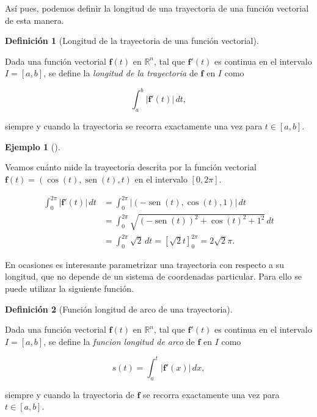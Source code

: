 \documentclass[
  a4paper,
]{scrreport}
\theoremstyle{definition}
\newtheorem{example}{Ejemplo}[chapter]
\theoremstyle{plain}
\theoremstyle{definition}
\newtheorem{definition}{Definición}[chapter]
\theoremstyle{definition}
\theoremstyle{plain}
\theoremstyle{plain}
\theoremstyle{remark}
\begin{document}
Así pues, podemos definir la longitud de una trayectoria de una función
vectorial de esta manera.

\begin{definition}[Longitud de la trayectoria de una función
vectorial]\protect\hypertarget{def-longitud-trayectoria-funcion-vectorial}{}\label{def-longitud-trayectoria-funcion-vectorial}

Dada una función vectorial \(\mathbf{f}(t)\) en \(\mathbb{R}^n\), tal
que \(\mathbf{f}'(t)\) es continua en el intervalo \(I=[a,b]\), se
define la \emph{longitud de la trayectoria} de \(\mathbf{f}\) en \(I\)
como

\[
\int_a^b |\mathbf{f}'(t)|\, dt,
\]

siempre y cuando la trayectoria se recorra exactamente una vez para
\(t\in[a,b]\).

\end{definition}

\begin{example}[]\protect\hypertarget{exm-longitud-trayectoria-espiral}{}\label{exm-longitud-trayectoria-espiral}

Veamos cuánto mide la trayectoria descrita por la función vectorial
\(\mathbf{f}(t)=(\cos(t),\operatorname{sen}(t), t)\) en el intervalo
\([0,2\pi]\).

\begin{align*}
\int_0^{2\pi} |\mathbf{f}'(t)|\, dt 
&= \int_0^{2\pi} |(-\operatorname{sen}(t), \cos(t), 1)|\, dt \\ 
&= \int_0^{2\pi} \sqrt{(-\operatorname{sen}(t))^2 + \cos(t)^2 + 1^2}\,dt \\
&= \int_0^{2\pi} \sqrt{2}\, dt
= [\sqrt{2}t]_0^{2\pi} 
= 2\sqrt{2}\pi.
\end{align*}

\end{example}

En ocasiones es interesante parametrizar una trayectoria con respecto a
su longitud, que no depende de un sistema de coordenadas particular.
Para ello se puede utilizar la siguiente función.

\begin{definition}[Función longitud de arco de una
trayectoria]\protect\hypertarget{def-funcion-longitud-arco}{}\label{def-funcion-longitud-arco}

Dada una función vectorial \(\mathbf{f}(t)\) en \(\mathbb{R}^n\), tal
que \(\mathbf{f}'(t)\) es continua en el intervalo \(I=[a,b]\), se
define la \emph{funcion longitud de arco} de \(\mathbf{f}\) en \(I\)
como

\[
s(t) = \int_a^t |\mathbf{f}'(x)|\, dx,
\]

siempre y cuando la trayectoria de \(\mathbf{f}\) se recorra exactamente
una vez para \(t\in[a,b]\).

\end{definition}
\end{document}
